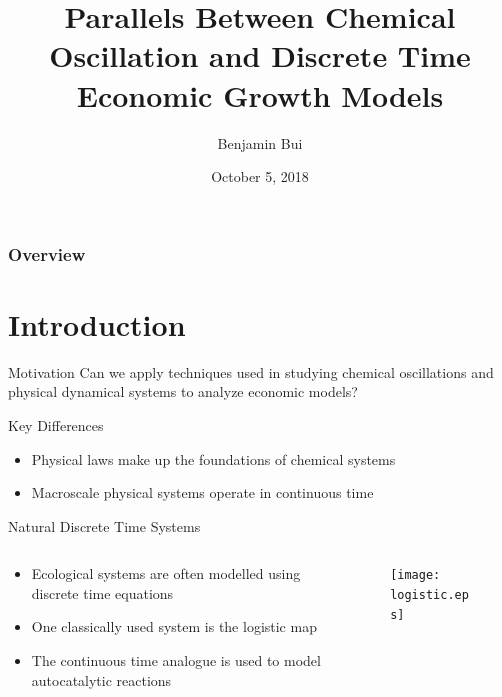 \documentclass{beamer}
\title{Parallels Between Chemical Oscillation and Discrete Time Economic Growth Models}
\author{Benjamin Bui}
\date{October 5, 2018}
\begin{document}
\begin{frame}
	\titlepage
\end{frame}

\begin{frame}
	\frametitle{Overview}
	\tableofcontents
\end{frame}

\section{Introduction}
\begin{frame}{Motivation}
	Can we apply techniques used in studying chemical oscillations and physical dynamical systems to analyze economic models?
\end{frame}

\begin{frame}{Key Differences}
	\begin{itemize}
		\item
			Physical laws make up the foundations of chemical systems

		\item
			Macroscale physical systems operate in continuous time
	\end{itemize}
\end{frame}

\begin{frame}{Natural Discrete Time Systems}
	\begin{columns}
		\begin{column}{0.5\textwidth}
			\begin{itemize}
					\item
						Ecological systems are often modelled using discrete time equations

					\item
						One classically used system is the logistic map\autocite{Maier2010}
					\item
						The continuous time analogue is used to model autocatalytic reactions
				\end{itemize}
		\end{column}
		\begin{column}{0.5\textwidth}
			\begin{figure}
				\centering
				\texttt{[image: logistic.eps]}
			\end{figure}
		\end{column}
	\end{columns}
\end{frame}
\end{document}

